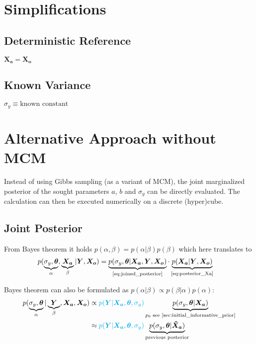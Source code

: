 \documentclass[10pt]{article}
\renewcommand{\vec}[1]{\boldsymbol{#1}}
\begin{document}
    
\section{Simplifications}

\subsection{Deterministic Reference}
$\vec{X_a} = \vec{X_o}$

\subsection{Known Variance}
$\sigma_y \equiv \text{known constant}$


\section{Alternative Approach without MCM}
Instead of using Gibbs sampling (as a variant of MCM), the joint marginalized posterior of the sought parameters $a$, $b$ and $\sigma_y$ can be directly evaluated. 
The calculation can then be executed numerically on a discrete (hyper)cube. 

\subsection{Joint Posterior}
From Bayes theorem it holds $p(\alpha, \beta) = p(\alpha|\beta) p(\beta)$ which here translates to
\begin{align}
    p(\underbrace{\sigma_y, \vec{\theta}}_{\alpha}, \underbrace{\vec{X_a}}_{\beta} | \vec{Y}, \vec{X_o}) 
    &= \underbrace{p(\sigma_y, \vec{\theta} | \vec{X_a}, \vec{Y}, \vec{X_o})}_{\text{\cref{eq:joined_posterior}}} \cdot 
    \underbrace{p(\vec{X_a} | \vec{Y}, \vec{X_o})}_{\text{\cref{eq:posterior_Xa}}}  \label{eq:joint_posterior_with_Xa}
\end{align}

Bayes theorem can also be formulated as $p(\alpha | \beta) \propto p(\beta | \alpha) p(\alpha)$:
\begin{align}
    p(\underbrace{\sigma_y, \vec{\theta}}_{\alpha} | \underbrace{\vec{Y}}_{\beta}, \vec{X_a}, \vec{X_o}) 
    &\propto {\color{cyan} p(\vec{Y} | \vec{X_a}, \vec{\theta}, \sigma_y)} \underbrace{p(\sigma_y, \vec{\theta} | \vec{X_a})}_{p_0 \text{ see \cref{sec:initial_informative_prior}}}  \label{eq:joined_posterior} \\
    &\approx {\color{cyan} p(\vec{Y} | \vec{X_a}, \vec{\theta}, \sigma_y)} \underbrace{p(\sigma_y, \vec{\theta} | \vec{\tilde{X}_a})}_{\text{previous posterior}}
\end{align}
\end{document}
